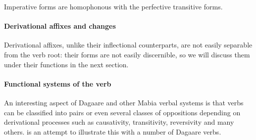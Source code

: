 
Imperative forms are homophonous with the perfective transitive forms.

\paragraph{Derivational affixes and changes}

Derivational affixes, unlike their inflectional counterparts, are not easily separable
from the verb root: their forms are not easily discernible, so we will discuss them under their
functions in the next section.

\paragraph{Functional systems of the verb}
An interesting aspect of Dagaare and other Mabia verbal systems is that verbs can
be classified into pairs or even several classes of oppositions depending on derivational
processes such as causativity, transitivity, reversivity and many others.  is an
attempt to illustrate this with a number of Dagaare verbs.

